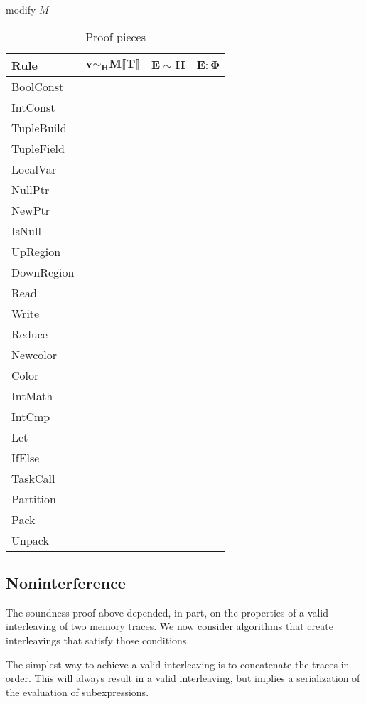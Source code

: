 modify $M$
\begin{table*}
\centering
{\small
\begin{tabular}{l|p{5cm}|p{5cm}|p{5cm}}
{\bf Rule} & 
\multicolumn{1}{|c|}{$\mathbf{v \sim_H M \llbracket T \rrbracket}$} &
\multicolumn{1}{|c|}{$\mathbf{E \sim H}$} &
\multicolumn{1}{|c|}{$\mathbf{E : \Phi}$} \\
\hline
BoolConst & & & \\
IntConst & & & \\
TupleBuild & & & \\
TupleField & & & \\
LocalVar & & & \\
NullPtr & & & \\
NewPtr & & & \\
IsNull & & & \\
UpRegion & & & \\
DownRegion & & & \\
Read & & & \\
Write & & & \\
Reduce & & & \\
Newcolor & & & \\
Color & & & \\
IntMath & & & \\
IntCmp & & & \\
Let & & & \\
IfElse & & & \\
TaskCall & & & \\
Partition & & & \\
Pack & & & \\
Unpack & & &
\end{tabular}}
\caption{Proof pieces}
\end{table*}


\subsection{Noninterference}

The soundness proof above depended, in part, on the properties of a valid interleaving of two
memory traces.  We now consider algorithms that create interleavings that satisfy those
conditions.

The simplest way to achieve a valid interleaving is to concatenate the traces in order.  This
will always result in a valid interleaving, but implies a serialization of the evaluation of
subexpressions.


